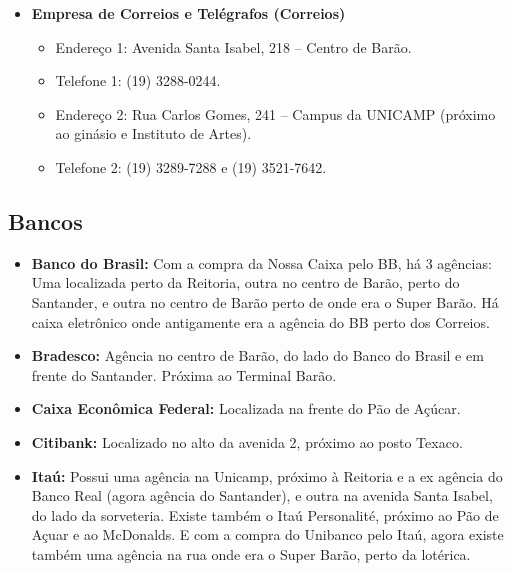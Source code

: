 \begin{itemize}
\item  \textbf{Empresa de Correios e Telégrafos (Correios)}
\begin{itemize}
\item  Endereço 1: Avenida Santa Isabel, 218 -- Centro de Barão.
\item  Telefone 1: (19) 3288-0244.
\item  Endereço 2: Rua Carlos Gomes, 241 -- Campus da UNICAMP (próximo ao ginásio e Instituto de Artes).
\item  Telefone 2: (19) 3289-7288 e (19) 3521-7642.
\end{itemize}
\end{itemize}

\subsection{Bancos}

\begin{itemize}
\item  \textbf{Banco do Brasil:} Com a compra da Nossa Caixa pelo BB, há 3 agências: Uma localizada perto da Reitoria, outra no centro de Barão, perto do Santander, e outra no centro de Barão perto de onde era o Super Barão. Há caixa eletrônico onde antigamente era a agência do BB perto dos Correios.
\end{itemize}

\begin{itemize}
\item  \textbf{Bradesco:} Agência no centro de Barão, do lado do Banco do Brasil e em frente do Santander. Próxima ao Terminal Barão.
\end{itemize}

\begin{itemize}
\item  \textbf{Caixa Econômica Federal:} Localizada na frente do Pão de Açúcar.
\end{itemize}

\begin{itemize}
\item  \textbf{Citibank:} Localizado no alto da avenida 2, próximo ao posto Texaco.
\end{itemize}

\begin{itemize}
\item  \textbf{Itaú:} Possui uma agência na Unicamp, próximo à Reitoria e a ex agência do Banco Real (agora agência do Santander), e outra na avenida Santa Isabel, do lado da sorveteria. Existe também o Itaú Personalité, próximo ao Pão de Açuar e ao McDonalds. E com a compra do Unibanco pelo Itaú, 
agora existe também uma agência na rua onde era o Super Barão, perto da lotérica.
\end{itemize}

